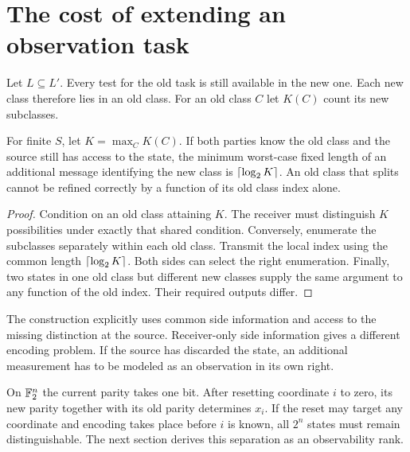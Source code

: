 \section{The cost of extending an observation task}\label{sec:refresh}
Let $L\subseteq L'$. Every test for the old task is still available in the new one. Each new class therefore lies in an old class. For an old class $C$ let $K(C)$ count its new subclasses.

\begin{theorem}\label{thm:refresh}
For finite $S$, let $K=\max_C K(C)$. If both parties know the old class and the source still has access to the state, the minimum worst-case fixed length of an additional message identifying the new class is $\left\lceil \log_2 K\right\rceil$. An old class that splits cannot be refined correctly by a function of its old class index alone.
\end{theorem}
\begin{proof}
Condition on an old class attaining $K$. The receiver must distinguish $K$ possibilities under exactly that shared condition. Conversely, enumerate the subclasses separately within each old class. Transmit the local index using the common length $\left\lceil \log_2 K\right\rceil$. Both sides can select the right enumeration. Finally, two states in one old class but different new classes supply the same argument to any function of the old index. Their required outputs differ.
\end{proof}
The construction explicitly uses common side information and access to the missing distinction at the source. Receiver-only side information gives a different encoding problem. If the source has discarded the state, an additional measurement has to be modeled as an observation in its own right.

\begin{example}
On $\mathbb F_2^n$ the current parity takes one bit. After resetting coordinate $i$ to zero, its new parity together with its old parity determines $x_i$. If the reset may target any coordinate and encoding takes place before $i$ is known, all $2^n$ states must remain distinguishable. The next section derives this separation as an observability rank.
\end{example}
